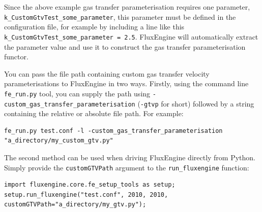 \documentclass[]{scrartcl}
\begin{document}
Since the above example gas transfer parameterisation requires one parameter, \texttt{k\_CustomGtvTest\_some\_parameter}, this parameter must be defined in the configuration file, for example by including a line like this \texttt{k\_CustomGtvTest\_some\_parameter = 2.5}. FluxEngine will automatically extract the parameter value and use it to construct the gas transfer parameterisation functor.

You can pass the file path containing custom gas transfer velocity parameterisations to FluxEngine in two ways. Firstly, using the command line \texttt{fe\_run.py} tool, you can supply the path using \texttt{-custom\_gas\_transfer\_parameterisation} (\texttt{-gtvp} for short) followed by a string containing the relative or absolute file path. For example:

\begin{lstlisting}
fe_run.py test.conf -l -custom_gas_transfer_parameterisation "a_directory/my_custom_gtv.py"
\end{lstlisting}

The second method can be used when driving FluxEngine directly from Python. Simply provide the \texttt{customGTVPath} argument to the \texttt{run\_fluxengine} function:

\begin{lstlisting}
import fluxengine.core.fe_setup_tools as setup;
setup.run_fluxengine("test.conf", 2010, 2010, customGTVPath="a_directory/my_gtv.py");
\end{lstlisting}
\end{document}
